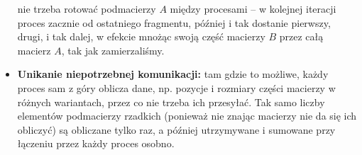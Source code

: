 \documentclass[a4paper,12pt,oneside]{article}
\begin{document}
\begin{itemize}
        nie trzeba rotować podmacierzy $A$ między procesami -- w kolejnej iteracji proces zacznie od ostatniego
        fragmentu, później i tak dostanie pierwszy, drugi, i tak dalej, w efekcie mnożąc swoją
        część macierzy $B$ przez całą macierz $A$, tak jak zamierzaliśmy.
    \item {\bf Unikanie niepotrzebnej komunikacji:} tam gdzie to możliwe, każdy proces sam z góry
        oblicza dane, np. pozycje i rozmiary części macierzy w różnych wariantach, przez co nie trzeba
        ich przesyłać. Tak samo liczby elementów podmacierzy rzadkich (ponieważ nie znając macierzy nie da się ich obliczyć)
        są obliczane tylko raz, a później utrzymywane i sumowane przy łączeniu przez każdy proces osobno.
\end{itemize}
\end{document}
